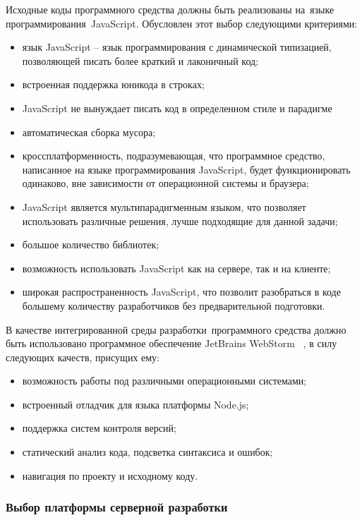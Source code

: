 Исходные коды программного средства должны быть реализованы на языке программирования JavaScript. Обусловлен этот выбор следующими критериями:

\begin{itemize}
  \item язык JavaScript -- язык программирования с динамической типизацией, позволяющей писать более краткий и лаконичный код;
  \item встроенная поддержка юникода в строках;
  \item JavaScript не вынуждает писать код в определенном стиле и парадигме
  \item автоматическая сборка мусора;
  \item кроссплатформенность, подразумевающая, что программное средство, написанное на языке программирования JavaScript, будет функционировать одинаково, вне зависимости от операционной системы и браузера;
  \item JavaScript является мультипарадигменным языком, что позволяет использовать различные решения, лучше подходящие для данной задачи;
  \item большое количество библиотек;
  \item возможность использовать JavaScript как на сервере, так и на клиенте;
  \item широкая распространенность JavaScript, что позволит разобраться в коде большему количеству разработчиков без предварительной подготовки.
\end{itemize}

В качестве интегрированной среды разработки программного средства должно быть использовано программное обеспечение JetBrains WebStorm ~\cite{webstorm}, в силу следующих качеств, присущих ему:
\begin{itemize}
  \item возможность работы под различными операционными системами;
  \item встроенный отладчик для языка платформы Node.js;
  \item поддержка систем контроля версий;
  \item статический анализ кода, подсветка синтаксиса и ошибок;
  \item навигация по проекту и исходному коду.
\end{itemize}

\subsubsection{Выбор платформы серверной разработки}

